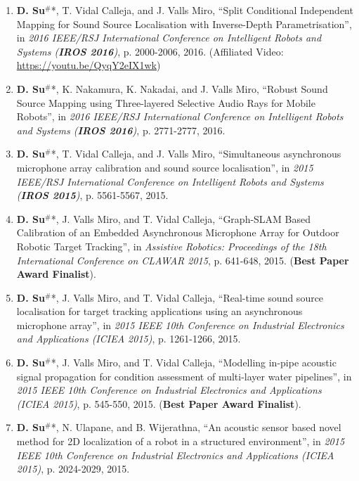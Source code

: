 \documentclass[margin,line]{res}
\begin{document}
\begin{resume}
\begin{enumerate}
\item {\bf D. Su}$^{\#}$*, T. Vidal Calleja, and J. Valls Miro, ``Split Conditional Independent Mapping for Sound Source Localisation with Inverse-Depth Parametrisation'', in {\it 2016 IEEE/RSJ International Conference on Intelligent Robots and Systems (\textbf{IROS 2016})}, p. 2000-2006, 2016. (Affiliated Video: \href{https://youtu.be/QyqY2eIX1wk}{{https://youtu.be/QyqY2eIX1wk}})

\item {\bf D. Su}$^{\#}$*, K. Nakamura, K. Nakadai, and J. Valls Miro, ``Robust Sound Source Mapping using Three-layered Selective Audio Rays for Mobile Robots'', in {\it 2016 IEEE/RSJ International Conference on Intelligent Robots and Systems (\textbf{IROS 2016})}, p. 2771-2777, 2016.

\item {\bf D. Su}$^{\#}$*, T. Vidal Calleja, and J. Valls Miro, ``Simultaneous asynchronous microphone array calibration and sound source localisation'', in {\it 2015 IEEE/RSJ International Conference on Intelligent Robots and Systems (\textbf{IROS 2015})}, p. 5561-5567, 2015.

\item {\bf D. Su}$^{\#}$*, J. Valls Miro, and T. Vidal Calleja, ``Graph-SLAM Based Calibration of an Embedded Asynchronous Microphone Array for Outdoor Robotic Target Tracking'', in {\it Assistive Robotics: Proceedings of the 18th International Conference on CLAWAR 2015}, p. 641-648, 2015. ({\bf Best Paper Award Finalist}).

\item {\bf D. Su}$^{\#}$*, J. Valls Miro, and T. Vidal Calleja, ``Real-time sound source localisation for target tracking applications using an asynchronous microphone array'', in {\it 2015 IEEE 10th Conference on Industrial Electronics and Applications (ICIEA 2015)}, p. 1261-1266, 2015.

\item {\bf D. Su}$^{\#}$*, J. Valls Miro, and T. Vidal Calleja, ``Modelling in-pipe acoustic signal propagation for condition assessment of multi-layer water pipelines'', in {\it 2015 IEEE 10th Conference on Industrial Electronics and Applications (ICIEA 2015)}, p. 545-550, 2015. ({\bf Best Paper Award Finalist}).

\item {\bf D. Su}$^{\#}$*, N. Ulapane, and B. Wijerathna, ``An acoustic sensor based novel method for 2D localization of a robot in a structured environment'', in {\it 2015 IEEE 10th Conference on Industrial Electronics and Applications (ICIEA 2015)}, p. 2024-2029, 2015.


\end{enumerate}
\end{resume}
\end{document}
